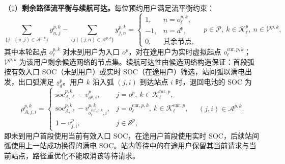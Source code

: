 \documentclass[12pt,a4paper,UTF8]{ctexart}
\begin{document}
（1）\textbf{剩余路径流平衡与续航可达。}每位预约用户满足流平衡约束：
\begin{equation}
\sum_{\{j\mid(n,j)\in\mathcal A^{p,k}\}}
y_{n,j}^{p,k}
-
\sum_{\{j\mid(j,n)\in\mathcal A^{p,k}\}}
y_{j,n}^{p,k}
=
\begin{cases}
1,&n=o_\ell^{p,k},\\
-1,&n=d^p,\\
0,&\text{其余节点},
\end{cases}
\quad
p\in\mathcal P,\ k\in\mathcal K_\ell^p,\ n\in\mathcal V^{p,k},
\label{eq:flow}
\end{equation}
其中本轮起点 $o_\ell^{p,k}$ 对未到用户为入口 $o^p$，对在途用户为实时虚拟起点 $o_\ell^{\mathrm{cur},p,k}$；$\mathcal V^{p,k}$ 为该用户剩余候选网络的节点集。续航可达性由候选网络构造保证：首段弧按有效入口 SOC（未到用户）或实时 SOC（在途用户）筛选，站间弧以满电出发，出口弧满足 $\underline s_d^p$。用户 $k$ 沿入弧 $(j,i)$ 到达站点 $i$ 时，退回电池的 SOC 为
\begin{equation}
\rho_{A,j,i}^{p,k}
=
\begin{cases}
\widetilde{\mathrm{soc}}_{A,\ell}^{p,k}-v_{o^p,i}^{p},
&j=o^p,\ k\in\mathcal K_\ell^{\mathrm{fut},p},\\[2pt]
\mathrm{soc}_{A,\ell}^{p,k}
-v_{o_\ell^{\mathrm{cur},p,k},i}^{p,k},
&j=o_\ell^{\mathrm{cur},p,k},\ k\in\mathcal K_\ell^{\mathrm{enr},p},\\[2pt]
1-v_{j,i}^{p},
&j\in\mathcal S^p,
\end{cases}
\quad (j,i)\in\mathcal A^{p,k}.
\label{eq:return_soc}
\end{equation}
即未到用户首段使用当前有效入口 SOC，在途用户首段使用实时 SOC，后续站间弧使用上一站成功换得的满电 SOC。站内等待中的在途用户保留其当前请求与当前站点，路径重优化不能取消该等待请求。
\end{document}
